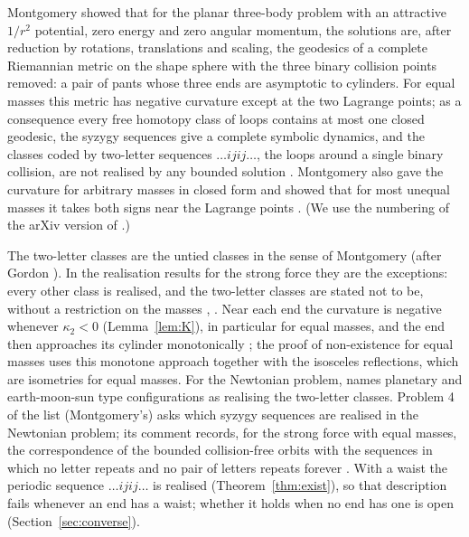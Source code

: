 \documentclass[11pt]{article}
\theoremstyle{definition}
\begin{document}
Montgomery \cite{M05} showed that for the planar three-body problem with an attractive $1/r^2$ potential, zero energy
and zero angular momentum, the solutions are, after reduction by rotations, translations and scaling, the geodesics of
a complete Riemannian metric on the shape sphere with the three binary collision points removed: a pair of pants whose
three ends are asymptotic to cylinders. For equal masses this metric has negative curvature except at the two Lagrange
points; as a consequence every free homotopy class of loops contains at most one closed geodesic, the syzygy sequences
give a complete symbolic dynamics, and the classes coded by two-letter sequences $\dots ijij\dots$, the loops around a
single binary collision, are not realised by any bounded solution \cite[Thm.~3]{M05}. Montgomery also gave the
curvature for arbitrary masses in closed form \cite[(7.12)-(7.13)]{M05} and showed that for most unequal masses it
takes both signs near the Lagrange points \cite[Thm.~6]{M05}. (We use the numbering of the arXiv version of \cite{M05}.)

The two-letter classes are the untied classes in the sense of Montgomery \cite{Mon98} (after Gordon
\cite{Gor75,Gor77}). In the realisation results for the strong force they are the exceptions: every other class is
realised, and the two-letter classes are stated not to be, without a restriction on the masses \cite[\S 2.1]{M05},
\cite[\S 1]{MM15}. Near each end the curvature is negative whenever $\kappa_2<0$ (Lemma~\ref{lem:K}), in particular for
equal masses, and the end then approaches its cylinder monotonically \cite[remark after (3.18)]{M05}; the proof of
non-existence for equal masses \cite[\S 6.3]{M05} uses this monotone approach together with the isosceles reflections,
which are isometries for equal masses. For the Newtonian problem, \cite[open question 6]{MM15} names planetary and
earth-moon-sun type configurations as realising the two-letter classes. Problem 4 of the list \cite{ACS12}
(Montgomery's) asks which syzygy sequences are realised in the Newtonian problem; its comment records, for the strong
force with equal masses, the correspondence of the bounded collision-free orbits with the sequences in which no letter
repeats and no pair of letters repeats forever \cite{M05}. With a waist the periodic sequence $\dots ijij\dots$ is
realised (Theorem~\ref{thm:exist}), so that description fails whenever an end has a waist; whether it holds when no
end has one is open (Section~\ref{sec:converse}).
\end{document}
